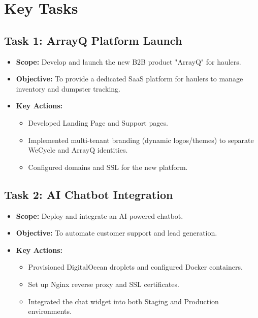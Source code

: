 \section{Key Tasks}

\subsection{Task 1: ArrayQ Platform Launch}
\begin{itemize}
    \item \textbf{Scope:} Develop and launch the new B2B product "ArrayQ" for haulers.
    \item \textbf{Objective:} To provide a dedicated SaaS platform for haulers to manage inventory and dumpster tracking.
    \item \textbf{Key Actions:}
    \begin{itemize}
        \item Developed Landing Page and Support pages.
        \item Implemented multi-tenant branding (dynamic logos/themes) to separate WeCycle and ArrayQ identities.
        \item Configured domains and SSL for the new platform.
    \end{itemize}
\end{itemize}

\subsection{Task 2: AI Chatbot Integration}
\begin{itemize}
    \item \textbf{Scope:} Deploy and integrate an AI-powered chatbot.
    \item \textbf{Objective:} To automate customer support and lead generation.
    \item \textbf{Key Actions:}
    \begin{itemize}
        \item Provisioned DigitalOcean droplets and configured Docker containers.
        \item Set up Nginx reverse proxy and SSL certificates.
        \item Integrated the chat widget into both Staging and Production environments.
    \end{itemize}
\end{itemize}

